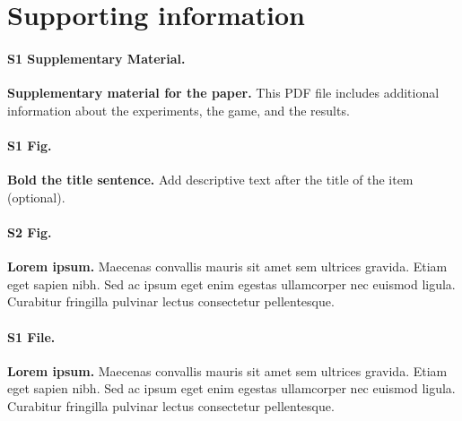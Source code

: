 \documentclass[10pt,letterpaper]{article}
\begin{document}
\linenumbers









\section*{Supporting information}

\paragraph*{S1 Supplementary Material.} 
\label{supplementary_material}
{\bf Supplementary material for the paper.} This PDF file includes additional information about the experiments, the game, and the results.


\iffalse
\paragraph*{S1 Fig.}
\label{S1_Fig}
{\bf Bold the title sentence.} Add descriptive text after the title of the item (optional).

\paragraph*{S2 Fig.}
\label{S2_Fig}
{\bf Lorem ipsum.} Maecenas convallis mauris sit amet sem ultrices gravida. Etiam eget sapien nibh. Sed ac ipsum eget enim egestas ullamcorper nec euismod ligula. Curabitur fringilla pulvinar lectus consectetur pellentesque.

\paragraph*{S1 File.}
\label{S1_File}
{\bf Lorem ipsum.}  Maecenas convallis mauris sit amet sem ultrices gravida. Etiam eget sapien nibh. Sed ac ipsum eget enim egestas ullamcorper nec euismod ligula. Curabitur fringilla pulvinar lectus consectetur pellentesque.
\end{document}
